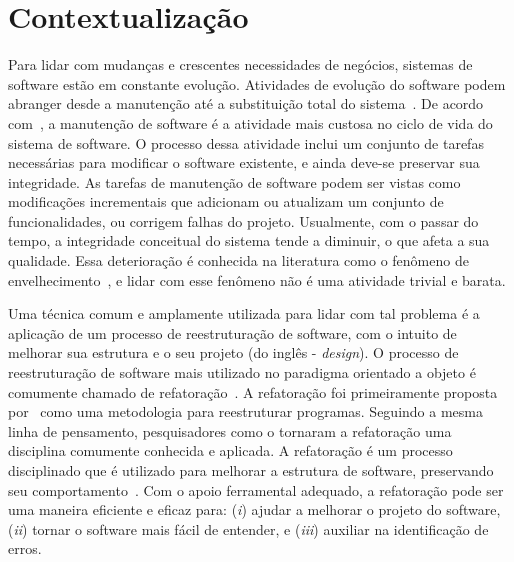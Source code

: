 
\section{Contextualização}\label{sec:contexto}


Para lidar com mudanças e crescentes necessidades de negócios, sistemas de software estão em constante evolução. Atividades de evolução do software podem abranger desde a manutenção até a substituição total do sistema~\cite{seacord_2003}. De acordo com~, a manutenção de software é a atividade mais custosa no ciclo de vida do sistema de software. O processo dessa atividade inclui um conjunto de tarefas necessárias para modificar o software existente, e ainda deve-se preservar sua integridade. As tarefas de manutenção de software podem ser vistas como modificações incrementais que adicionam ou atualizam um conjunto de funcionalidades, ou corrigem falhas do projeto. Usualmente, com o passar do tempo, a integridade conceitual do sistema tende a diminuir, o que afeta a sua qualidade. Essa deterioração é conhecida na literatura como o fenômeno de envelhecimento~\cite{Fowler1999}, e lidar com esse fenômeno não é uma atividade trivial e barata.

Uma técnica comum e amplamente utilizada para lidar com tal problema é a aplicação de um processo de reestruturação de software, com o intuito de melhorar sua estrutura e o seu projeto (do inglês - \emph{design}). O processo de reestruturação de software mais utilizado no paradigma orientado a objeto é comumente chamado de refatoração~\cite{OPDYKE_1992, Fowler1999, Mens04}. A refatoração foi primeiramente proposta por~ como uma metodologia para reestruturar programas. Seguindo a mesma linha de pensamento, pesquisadores como o  tornaram a refatoração uma disciplina comumente conhecida e aplicada. A refatoração é um processo disciplinado que é utilizado para melhorar a estrutura de software, preservando seu comportamento~\cite{Fowler1999}. Com o apoio ferramental adequado, a refatoração pode ser uma maneira eficiente e eficaz para: (\textit{i}) ajudar a melhorar o projeto do software, (\textit{ii}) tornar o software mais fácil de entender, e (\textit{iii}) auxiliar na identificação de erros. %


